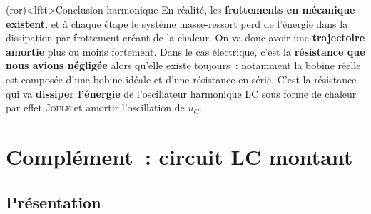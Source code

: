 \documentclass[../../main/main.tex]{subfiles}
\begin{document}
\begin{tcb}[label=ror:harmotoamorti](ror)<lftt>{Conclusion harmonique}
	En réalité, les \textbf{frottements en mécanique existent}, et à chaque étape
	le système masse-ressort perd de l'énergie dans la dissipation par frottement
	créant de la chaleur. On va donc avoir une \textbf{trajectoire amortie} plus
	ou moins fortement.
	\bigbreak
	Dans le cas électrique, c'est la \textbf{résistance que nous avions négligée}
	alors qu'elle existe toujours~: notamment la bobine réelle est composée d'une
	bobine idéale et d'une résistance en série. C'est la résistance qui va
	\textbf{dissiper l'énergie} de l'oscillateur harmonique LC sous forme de
	chaleur par effet \textsc{Joule} et amortir l'oscillation de $u_C$.
\end{tcb}

\section{Complément~: circuit LC montant}

\subsection{Présentation}
\end{document}
